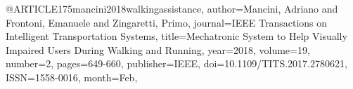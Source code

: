 @ARTICLE{175mancini2018walkingassistance,
author={Mancini, Adriano and Frontoni, Emanuele and Zingaretti, Primo},
journal={IEEE Transactions on Intelligent Transportation Systems}, 
title={Mechatronic System to Help Visually Impaired Users During Walking and Running}, 
year={2018},
volume={19},
number={2},
pages={649-660},
publisher={IEEE},
doi={10.1109/TITS.2017.2780621},
ISSN={1558-0016},
month={Feb},}